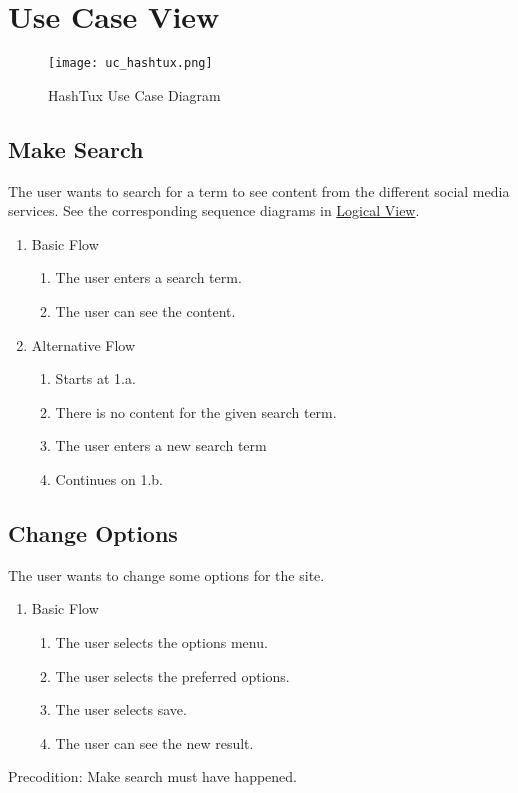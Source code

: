 \chapter{Use Case View}

\begin{figure}[ht]
  \centering
  \texttt{[image: uc\_hashtux.png]}
  \caption{HashTux Use Case Diagram}
\end{figure}

\section{Make Search}
The user wants to search for a term to see content from the different social
media services. See the corresponding sequence diagrams in
\hyperlink{logicalview}{Logical View}.
\begin{enumerate}
  \item Basic Flow
  \begin{enumerate}
    \item The user enters a search term.
    \item The user can see the content.
  \end{enumerate}
  \item Alternative Flow
  \begin{enumerate}
    \item Starts at 1.a.
    \item There is no content for the given search term.
    \item The user enters a new search term
    \item Continues on 1.b.
  \end{enumerate}
\end{enumerate}

\section{Change Options}
The user wants to change some options for the site.
\begin{enumerate}
\item Basic Flow
  \begin{enumerate}
    \item The user selects the options menu.
    \item The user selects the preferred options.
    \item The user selects save.
    \item The user can see the new result.
  \end{enumerate}
\end{enumerate}
Precodition: \newline
Make search must have happened.

